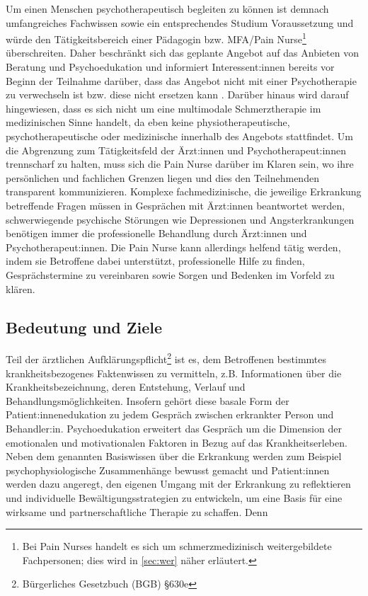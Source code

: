 \documentclass[
  twoside,
  parskip=half-,
  paper=176mm:246mm,
  BCOR=14mm,
  DIV=14,
]{scrreprt}
\begin{document}
\begin{praxis}
  Um einen Menschen psychotherapeutisch begleiten zu können ist demnach umfangreiches Fachwissen sowie ein entsprechendes Studium Voraussetzung und würde den Tätigkeitsbereich einer Pädagogin bzw. MFA/Pain Nurse\footnote{Bei Pain Nurses handelt es sich um schmerzmedizinisch weitergebildete Fachpersonen; dies wird in \autoref{sec:wer} näher erläutert.} überschreiten. Daher beschränkt sich das geplante Angebot auf das Anbieten von Beratung und Psychoedukation und informiert Interessent:innen bereits vor Beginn der Teilnahme darüber, dass das Angebot nicht mit einer Psychotherapie zu verwechseln ist bzw. diese nicht ersetzen kann \autocite[vgl.][898]{integrativePsycho}. Darüber hinaus wird darauf hingewiesen, dass es sich nicht um eine multimodale Schmerztherapie im medizinischen Sinne handelt, da eben keine physiotherapeutische, psychotherapeutische oder medizinische  innerhalb des Angebots stattfindet. Um die Abgrenzung zum Tätigkeitsfeld der Ärzt:innen und Psychotherapeut:innen trennscharf zu halten, muss sich die Pain Nurse darüber im Klaren sein, wo ihre persönlichen und fachlichen Grenzen liegen und dies den Teilnehmenden transparent kommunizieren. Komplexe fachmedizinische, die jeweilige Erkrankung betreffende Fragen müssen in Gesprächen mit Ärzt:innen beantwortet werden, schwerwiegende psychische Störungen wie Depressionen und Angsterkrankungen benötigen immer die professionelle Behandlung durch Ärzt:innen und Psychotherapeut:innen. Die Pain Nurse kann allerdings helfend tätig werden, indem sie Betroffene dabei unterstützt, professionelle Hilfe zu finden, Gesprächstermine zu vereinbaren sowie Sorgen und Bedenken im Vorfeld zu klären.
\end{praxis}


\subsection{Bedeutung und Ziele}

Teil der ärztlichen Aufklärungspflicht\footnote{Bürgerliches Gesetzbuch (BGB) §630e} ist es, dem Betroffenen bestimmtes krankheitsbezogenes Faktenwissen zu vermitteln, z.B. Informationen über die Krankheitsbezeichnung, deren Entstehung, Verlauf und Behandlungsmöglichkeiten. Insofern gehört diese basale Form der Patient:innenedukation zu jedem Gespräch zwischen erkrankter Person und Behandler:in. Psychoedukation erweitert das Gespräch um die Dimension der emotionalen und motivationalen Faktoren in Bezug auf das Krankheitserleben. Neben dem genannten Basiswissen über die Erkrankung werden zum Beispiel psychophysiologische Zusammenhänge bewusst gemacht und Patient:innen werden dazu angeregt, den eigenen Umgang mit der Erkrankung zu reflektieren und individuelle Bewältigungsstrategien zu entwickeln, um eine Basis für eine wirksame und partnerschaftliche Therapie zu schaffen. Denn  
\end{document}
